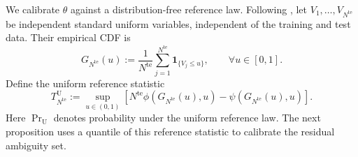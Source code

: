 \documentclass[review,11pt,3p,authoryear,nopreprintline]{elsarticle}
\begin{document}
We calibrate $\theta$ against a distribution-free reference law. Following \citet{L.J23}, let $V_1,\ldots,V_{N^{\mathrm{te}}}$ be independent standard uniform variables, independent of the training and test data. Their empirical CDF is
\begin{equation}
  G_{N^{\mathrm{te}}}(u):=\frac{1}{N^{\mathrm{te}}}\sum_{j=1}^{N^{\mathrm{te}}}\mathbf 1_{\{V_j\le u\}},\qquad \forall u\in[0,1].
  \label{eq-dw-reference-cdf}
\end{equation}
Define the uniform reference statistic
\begin{equation}
  T_{N^{\mathrm{te}}}^{\mathrm U}:=\sup_{u\in(0,1)}\left[N^{\mathrm{te}}\phi\!\left(G_{N^{\mathrm{te}}}(u),u\right)-\psi\!\left(G_{N^{\mathrm{te}}}(u),u\right)\right].
  \label{eq-dw-reference-statistic}
\end{equation}
Here $\Pr_{\mathrm U}$ denotes probability under the uniform reference law. The next proposition uses a quantile of this reference statistic to calibrate the residual ambiguity set.
\end{document}
